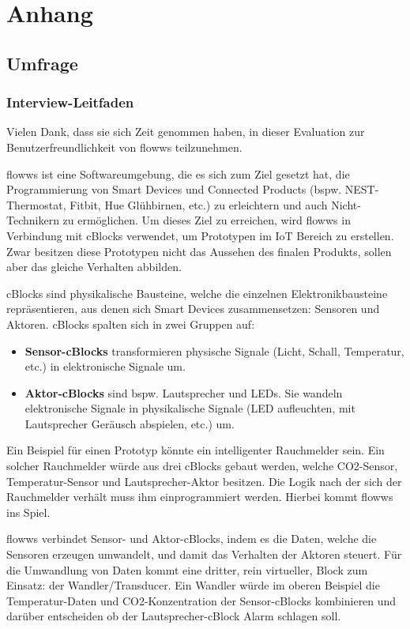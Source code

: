 \chapter{Anhang}

\section{Umfrage}
\subsection{Interview-Leitfaden}\label{subsec:leitfaden}
Vielen Dank, dass sie sich Zeit genommen haben, in dieser Evaluation zur Benutzerfreundlichkeit von flowws teilzunehmen.

flowws ist eine Softwareumgebung, die es sich zum Ziel gesetzt hat, die Programmierung von Smart Devices und Connected Products (bspw. NEST-Thermostat, Fitbit, Hue Glühbirnen, etc.) zu erleichtern und auch Nicht-Technikern zu ermöglichen. Um dieses Ziel zu erreichen, wird flowws in Verbindung mit cBlocks verwendet, um Prototypen im \ac{IoT} Bereich zu erstellen. Zwar besitzen diese Prototypen nicht das Aussehen des finalen Produkts, sollen aber das gleiche Verhalten abbilden. 

cBlocks sind physikalische Bausteine, welche die einzelnen Elektronikbausteine repräsentieren, aus denen sich Smart Devices zusammensetzen: Sensoren und Aktoren. cBlocks spalten sich in zwei Gruppen auf:
\begin{itemize}
    \item \textbf{Sensor-cBlocks} transformieren physische Signale (Licht, Schall, Temperatur, etc.) in elektronische Signale um.
    \item \textbf{Aktor-cBlocks} sind bspw. Lautsprecher und LEDs. Sie wandeln elektronische Signale in physikalische Signale (LED aufleuchten, mit Lautsprecher Geräusch abspielen, etc.) um.
\end{itemize}
Ein Beispiel für einen Prototyp könnte ein intelligenter Rauchmelder sein. Ein solcher Rauchmelder würde aus drei cBlocks gebaut werden, welche CO2-Sensor, Temperatur-Sensor und Lautsprecher-Aktor besitzen. Die Logik nach der sich der Rauchmelder verhält muss ihm einprogrammiert werden. Hierbei kommt flowws ins Spiel.

flowws verbindet Sensor- und Aktor-cBlocks, indem es die Daten, welche die Sensoren erzeugen umwandelt, und damit das Verhalten der Aktoren steuert. Für die Umwandlung von Daten kommt eine dritter, rein virtueller, Block zum Einsatz: der Wandler/Transducer. Ein Wandler würde im oberen Beispiel die Temperatur-Daten und CO2-Konzentration der Sensor-cBlocks kombinieren und darüber entscheiden ob der Lautsprecher-cBlock Alarm schlagen soll.

